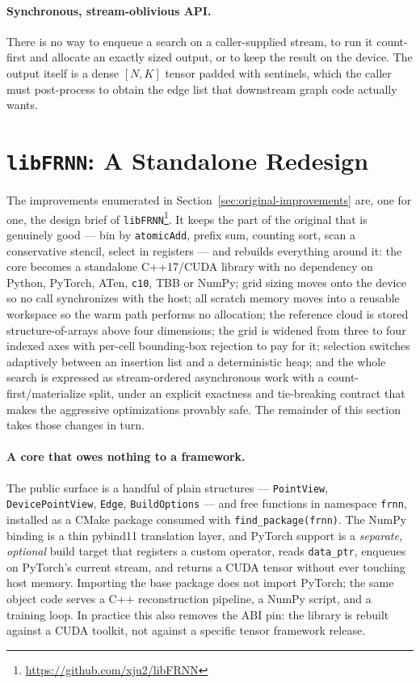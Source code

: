 \documentclass[11pt]{article}
\begin{document}
\paragraph{Synchronous, stream-oblivious API.}
There is no way to enqueue a search on a caller-supplied stream, to run it
count-first and allocate an exactly sized output, or to keep the result on the
device. The output itself is a dense $[N, K]$ tensor padded with sentinels,
which the caller must post-process to obtain the edge list that downstream graph
code actually wants.

\section{\texttt{libFRNN}: A Standalone Redesign}
\label{sec:libfrnn}

The improvements enumerated in Section~\ref{sec:original-improvements} are, one
for one, the design brief of
\texttt{libFRNN}\footnote{\url{https://github.com/xju2/libFRNN}}. It keeps the
part of the original that is genuinely good --- bin by \texttt{atomicAdd}, prefix
sum, counting sort, scan a conservative stencil, select in registers --- and
rebuilds everything around it: the core becomes a standalone C++17/CUDA library
with no dependency on Python, PyTorch, ATen, \texttt{c10}, TBB or NumPy; grid
sizing moves onto the device so no call synchronizes with the host; all scratch
memory moves into a reusable workspace so the warm path performs no allocation;
the reference cloud is stored structure-of-arrays above four dimensions; the
grid is widened from three to four indexed axes with per-cell bounding-box
rejection to pay for it; selection switches adaptively between an insertion list
and a deterministic heap; and the whole search is expressed as stream-ordered
asynchronous work with a count-first/materialize split, under an explicit
exactness and tie-breaking contract that makes the aggressive optimizations
provably safe. The remainder of this section takes those changes in turn.

\paragraph{A core that owes nothing to a framework.}
The public surface is a handful of plain structures --- \texttt{PointView},
\texttt{DevicePointView}, \texttt{Edge}, \texttt{BuildOptions} --- and free
functions in namespace \texttt{frnn}, installed as a CMake package consumed with
\texttt{find\_package(frnn)}. The NumPy binding is a thin pybind11 translation
layer, and PyTorch support is a \emph{separate, optional} build target that
registers a custom operator, reads \texttt{data\_ptr}, enqueues on PyTorch's
current stream, and returns a CUDA tensor without ever touching host memory.
Importing the base package does not import PyTorch; the same object code serves
a C++ reconstruction pipeline, a NumPy script, and a training loop. In practice
this also removes the ABI pin: the library is rebuilt against a CUDA toolkit,
not against a specific tensor framework release.
\end{document}
